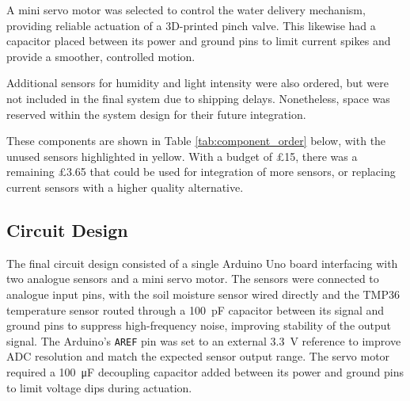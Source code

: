 \documentclass[a4paper,11pt]{article}
\begin{document}
A mini servo motor was selected to control the water delivery mechanism, 
providing reliable actuation of a 3D-printed pinch valve.
This likewise had a capacitor placed between its power and ground pins 
to limit current spikes and provide a smoother, controlled motion.

Additional sensors for humidity and light intensity were also ordered, 
but were not included in the final system due to shipping delays. 
Nonetheless, space was reserved within the system design 
for their future integration.

These components are shown in Table \ref{tab:component_order} below,
with the unused sensors highlighted in yellow.
With a budget of £15, there was a remaining £3.65 
that could be used for integration of more sensors,
or replacing current sensors with a higher quality alternative.

\begin{table}[H]
    \centering
    \renewcommand{\arraystretch}{1.5} 
    \caption{Component Order Summary}
    \label{tab:component_order}
\end{table}

\subsection{Circuit Design}
\label{sec:circuit_design}

The final circuit design consisted of a single Arduino Uno board interfacing 
with two analogue sensors and a mini servo motor. The sensors were connected 
to analogue input pins, with the soil moisture sensor wired directly and the 
TMP36 temperature sensor routed through a \SI{100}{\pico\farad} capacitor 
between its signal and ground pins to suppress high-frequency noise,
improving stability of the output signal. 
The Arduino's \texttt{AREF} pin was set to an external \SI{3.3}{\volt} reference 
to improve ADC resolution and match the expected sensor output range.
The servo motor required a \SI{100}{\micro\farad} decoupling capacitor added between 
its power and ground pins to limit voltage dips during actuation.
\end{document}

